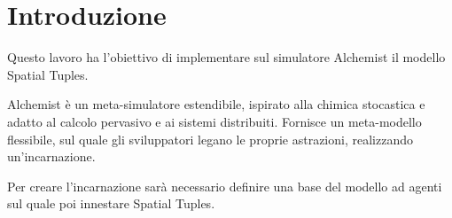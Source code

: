 \documentclass[12pt,a4paper,openright,twoside]{report}
\begin{document}
\begin{titlepage}

\thispagestyle{empty}

\topmargin=6.5cm

\raggedleft

\large

\em


\newpage

\clearpage{\pagestyle{empty}\cleardoublepage}
\end{titlepage}

\chapter*{Introduzione} %


Questo lavoro ha l'obiettivo di implementare sul simulatore Alchemist il modello Spatial Tuples.

Alchemist \`e un meta-simulatore estendibile, ispirato alla chimica stocastica e adatto al calcolo pervasivo e ai sistemi distribuiti. Fornisce un meta-modello flessibile, sul quale gli sviluppatori legano le proprie astrazioni, realizzando un'incarnazione.

Per creare l'incarnazione sar\`a necessario definire una base del modello ad agenti sul quale poi innestare Spatial Tuples.

\clearpage{\pagestyle{empty}\cleardoublepage}

\tableofcontents

\rhead[\fancyplain{}{\bfseries\leftmark}]{\fancyplain{}{\bfseries\thepage}}
\end{document}
